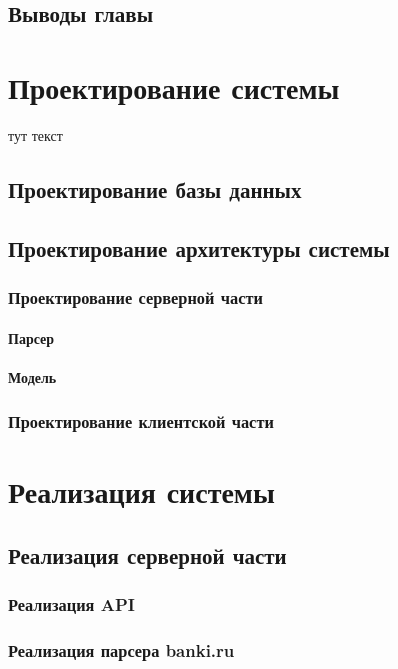 \documentclass[PI, VKR]{HSEUniversity}
\begin{document}
\section{Выводы главы}
\label{sec:org3ab2c23}
\chapter{Проектирование системы}
\label{sec:org84bfd39}
тут текст
\section{Проектирование базы данных}
\label{sec:org2323d02}

\section{Проектирование архитектуры системы}
\label{sec:orgf3352ca}
\subsection{Проектирование серверной части}
\label{sec:org0de1bc7}
\subsubsection{Парсер}
\label{sec:org58c1ee9}
\subsubsection{Модель}
\label{sec:org16a71c1}
\subsection{Проектирование клиентской части}
\label{sec:org1b7f4fa}
\chapter{Реализация системы}
\label{sec:org090e598}
\section{Реализация серверной части}
\label{sec:orgff5e72c}
\subsection{Реализация API}
\label{sec:org9df22df}
\subsection{Реализация парсера banki.ru}
\label{sec:orgc6fc0c0}
\end{document}
